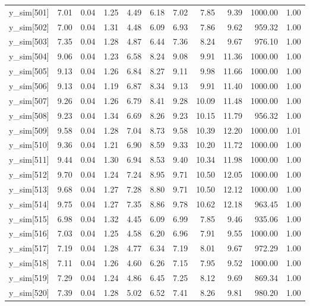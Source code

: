 \begin{table}[ht]
\begin{tabular}{rrrrrrrrrrr}
  y\_sim[501] & 7.01 & 0.04 & 1.25 & 4.49 & 6.18 & 7.02 & 7.85 & 9.39 & 1000.00 & 1.00 \\ 
  y\_sim[502] & 7.00 & 0.04 & 1.31 & 4.48 & 6.09 & 6.93 & 7.86 & 9.62 & 959.32 & 1.00 \\ 
  y\_sim[503] & 7.35 & 0.04 & 1.28 & 4.87 & 6.44 & 7.36 & 8.24 & 9.67 & 976.10 & 1.00 \\ 
  y\_sim[504] & 9.06 & 0.04 & 1.23 & 6.58 & 8.24 & 9.08 & 9.91 & 11.36 & 1000.00 & 1.00 \\ 
  y\_sim[505] & 9.13 & 0.04 & 1.26 & 6.84 & 8.27 & 9.11 & 9.98 & 11.66 & 1000.00 & 1.00 \\ 
  y\_sim[506] & 9.13 & 0.04 & 1.19 & 6.87 & 8.34 & 9.13 & 9.91 & 11.40 & 1000.00 & 1.00 \\ 
  y\_sim[507] & 9.26 & 0.04 & 1.26 & 6.79 & 8.41 & 9.28 & 10.09 & 11.48 & 1000.00 & 1.00 \\ 
  y\_sim[508] & 9.23 & 0.04 & 1.34 & 6.69 & 8.26 & 9.23 & 10.15 & 11.79 & 956.32 & 1.00 \\ 
  y\_sim[509] & 9.58 & 0.04 & 1.28 & 7.04 & 8.73 & 9.58 & 10.39 & 12.20 & 1000.00 & 1.01 \\ 
  y\_sim[510] & 9.36 & 0.04 & 1.21 & 6.90 & 8.59 & 9.33 & 10.20 & 11.72 & 1000.00 & 1.00 \\ 
  y\_sim[511] & 9.44 & 0.04 & 1.30 & 6.94 & 8.53 & 9.40 & 10.34 & 11.98 & 1000.00 & 1.00 \\ 
  y\_sim[512] & 9.70 & 0.04 & 1.24 & 7.24 & 8.95 & 9.71 & 10.50 & 12.05 & 1000.00 & 1.00 \\ 
  y\_sim[513] & 9.68 & 0.04 & 1.27 & 7.28 & 8.80 & 9.71 & 10.50 & 12.12 & 1000.00 & 1.00 \\ 
  y\_sim[514] & 9.75 & 0.04 & 1.27 & 7.35 & 8.86 & 9.78 & 10.62 & 12.18 & 963.45 & 1.00 \\ 
  y\_sim[515] & 6.98 & 0.04 & 1.32 & 4.45 & 6.09 & 6.99 & 7.85 & 9.46 & 935.06 & 1.00 \\ 
  y\_sim[516] & 7.03 & 0.04 & 1.25 & 4.58 & 6.20 & 6.96 & 7.91 & 9.55 & 1000.00 & 1.00 \\ 
  y\_sim[517] & 7.19 & 0.04 & 1.28 & 4.77 & 6.34 & 7.19 & 8.01 & 9.67 & 972.29 & 1.00 \\ 
  y\_sim[518] & 7.11 & 0.04 & 1.26 & 4.60 & 6.26 & 7.15 & 7.95 & 9.52 & 1000.00 & 1.00 \\ 
  y\_sim[519] & 7.29 & 0.04 & 1.24 & 4.86 & 6.45 & 7.25 & 8.12 & 9.69 & 869.34 & 1.00 \\ 
  y\_sim[520] & 7.39 & 0.04 & 1.28 & 5.02 & 6.52 & 7.41 & 8.26 & 9.81 & 980.20 & 1.00 \\ 

\end{tabular}
\end{table}
